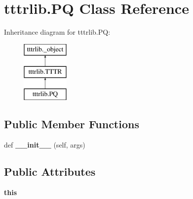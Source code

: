 \hypertarget{classtttrlib_1_1_p_q}{}\section{tttrlib.\+PQ Class Reference}
\label{classtttrlib_1_1_p_q}
Inheritance diagram for tttrlib.\+PQ\+:\begin{figure}[H]
\begin{center}
\leavevmode
\includegraphics[height=3.000000cm]{classtttrlib_1_1_p_q}
\end{center}
\end{figure}
\subsection*{Public Member Functions}
\begin{DoxyCompactItemize}
\item 
\mbox{\label{classtttrlib_1_1_p_q_a19799a7e0c53d5f3be6f0ea67182a4c2}} 
def {\bfseries \+\_\+\+\_\+init\+\_\+\+\_\+} (self, args)
\end{DoxyCompactItemize}
\subsection*{Public Attributes}
\begin{DoxyCompactItemize}
\item 
\mbox{\label{classtttrlib_1_1_p_q_a6032dbd768a51dd85ef50fabc4418187}} 
{\bfseries this}
\end{DoxyCompactItemize}
